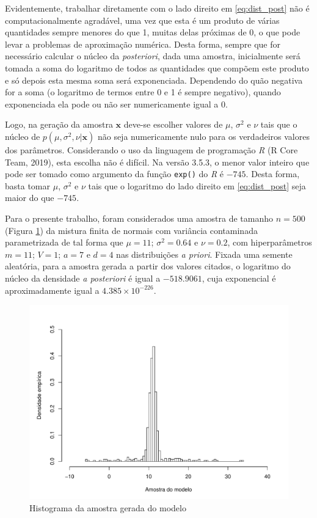 Evidentemente, trabalhar diretamente com o lado direito em \eqref{eq:dist_post} não é computacionalmente agradável, uma vez que esta é um produto de várias quantidades sempre menores do que 1, muitas delas próximas de 0, o que pode levar a problemas de aproximação numérica. Desta forma, sempre que for necessário calcular o núcleo da \textit{posteriori}, dada uma amostra, inicialmente será tomada a soma do logaritmo de todos as quantidades que compõem este produto e só depois esta mesma soma será exponenciada. Dependendo do quão negativa for a soma (o logaritmo de termos entre 0 e 1 é sempre negativo), quando exponenciada ela pode ou não ser numericamente igual a 0.

Logo, na geração da amostra $\bm{x}$ deve-se escolher valores de $\mu$, $\sigma^2$ e $\nu$ tais que o núcleo de $p(\mu, \sigma^2, \nu | \bm{x})$ não seja numericamente nulo para os verdadeiros valores dos parâmetros. Considerando o uso da linguagem de programação \textit{R} (R Core Team, 2019)\cite{RCoreTeam2019}, esta escolha não é difícil. Na versão 3.5.3, o menor valor inteiro que pode ser tomado como argumento da função \verb|exp()| do \textit{R} é $-745$. Desta forma, basta tomar $\mu$, $\sigma^2$ e $\nu$ tais que o logaritmo do lado direito em \eqref{eq:dist_post} seja maior do que $-745$.

Para o presente trabalho, foram considerados uma amostra de tamanho $n=500$ (Figura \ref{fig:sample_n}) da mistura finita de normais com variância contaminada parametrizada de tal forma que $\mu = 11$; $\sigma^2 = 0.64$ e $\nu = 0.2$, com hiperparâmetros $m = 11$; $V = 1$; $a = 7$ e $d = 4$ nas distribuições \textit{a priori}. Fixada uma semente aleatória, para a amostra gerada a partir dos valores citados, o logaritmo do núcleo da densidade \textit{a posteriori} é igual a $-518.9061$, cuja exponencial é aproximadamente igual a $4.385 \times 10^{-226}$.

\begin{figure}[htb]
	\centering
	\includegraphics[scale=0.8]{figuras/amostra_n.pdf}
	\caption{Histograma da amostra gerada do modelo}
	\label{fig:sample_n}
\end{figure}

